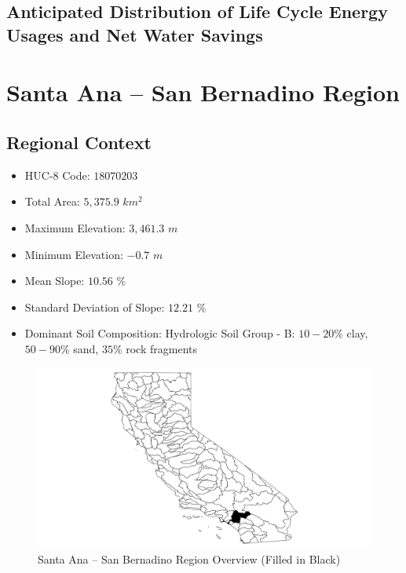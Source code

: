     \subsection{Anticipated Distribution of Life Cycle Energy Usages and Net Water Savings}

\section{Santa Ana -- San Bernadino Region}

    \subsection{Regional Context}

    \begin{itemize}
      \setlength{\itemsep}{0cm}
      \setlength{\parskip}{0cm}
        \item HUC-8 Code: $18070203$
        \item Total Area: $5,375.9$ $km^2$
        \item Maximum Elevation: $3,461.3$ $m$
        \item Minimum Elevation: $-0.7$ $m$
        \item Mean Slope: $10.56$ $\%$
        \item Standard Deviation of Slope: $12.21$ $\%$
        \item Dominant Soil Composition: Hydrologic Soil Group - B: $10-20\%$ clay, $50-90\%$ sand, $35\%$ rock fragments
    \end{itemize}
    
        \begin{figure}[!h]
            \begin{center}
            \includegraphics[width=5.5in]{figures/SanBernadino_Overview.png}   
            \caption{Santa Ana -- San Bernadino Region Overview (Filled in Black)}
            \label{fig:SASBoverview}
            \end{center}
        \end{figure}

